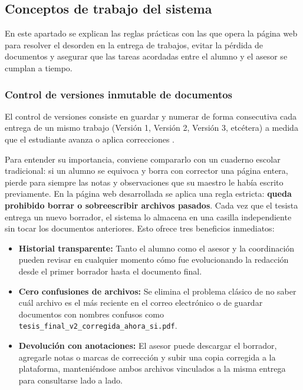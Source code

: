 \subsection{Conceptos de trabajo del sistema}
\label{subsec:conceptos_trabajo}

En este apartado se explican las reglas prácticas con las que opera la página web para resolver el desorden en la entrega de trabajos, evitar la pérdida de documentos y asegurar que las tareas acordadas entre el alumno y el asesor se cumplan a tiempo.

\subsubsection{Control de versiones inmutable de documentos}
El control de versiones consiste en guardar y numerar de forma consecutiva cada entrega de un mismo trabajo (Versión 1, Versión 2, Versión 3, etcétera) a medida que el estudiante avanza o aplica correcciones \parencite{chacon2014progit}. 

Para entender su importancia, conviene compararlo con un cuaderno escolar tradicional: si un alumno se equivoca y borra con corrector una página entera, pierde para siempre las notas y observaciones que su maestro le había escrito previamente. En la página web desarrollada se aplica una regla estricta: \textbf{queda prohibido borrar o sobreescribir archivos pasados}. Cada vez que el tesista entrega un nuevo borrador, el sistema lo almacena en una casilla independiente sin tocar los documentos anteriores. Esto ofrece tres beneficios inmediatos:
\begin{itemize}
    \item \textbf{Historial transparente:} Tanto el alumno como el asesor y la coordinación pueden revisar en cualquier momento cómo fue evolucionando la redacción desde el primer borrador hasta el documento final.
    \item \textbf{Cero confusiones de archivos:} Se elimina el problema clásico de no saber cuál archivo es el más reciente en el correo electrónico o de guardar documentos con nombres confusos como \texttt{tesis\_final\_v2\_corregida\_ahora\_si.pdf}.
    \item \textbf{Devolución con anotaciones:} El asesor puede descargar el borrador, agregarle notas o marcas de corrección y subir una copia corregida a la plataforma, manteniéndose ambos archivos vinculados a la misma entrega para consultarse lado a lado.
\end{itemize}

